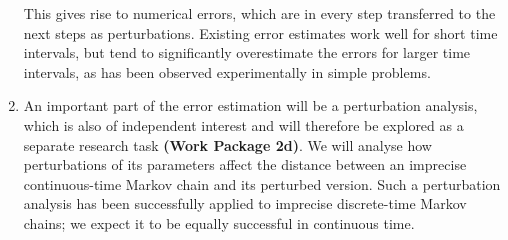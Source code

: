 \documentclass[11pt,dvipsnames,usenames,a4paper]{article}
\begin{document}
\begin{enumerate}[label=\tiny$\blacksquare$,leftmargin=*,noitemsep]
This gives rise to numerical errors, which are in every step transferred to the next steps as perturbations. 
Existing error estimates work well for short time intervals, but tend to significantly overestimate the errors for larger time intervals, as has been observed experimentally in simple problems.
\item An important part of the error estimation will be a perturbation analysis, which is also of independent interest and will therefore be explored as a separate research task {\bf(Work Package 2d)}.
We will analyse how perturbations of its parameters affect the distance between an imprecise continuous-time Markov chain and its perturbed version.
Such a perturbation analysis has been successfully applied to imprecise discrete-time Markov chains; we expect it to be equally successful in continuous time.
\end{enumerate}
%
%
%
%
%
%
%
%
%
%
%
%
%
%
%
%
\end{document}
